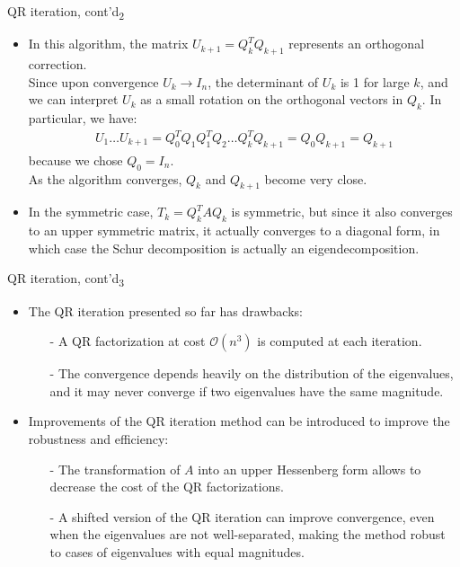 \documentclass[t,usepdftitle=false]{beamer}
\begin{document}
\begin{frame}{QR iteration, cont'd\textsubscript{2}}
\begin{itemize}
\item In this algorithm, the matrix $U_{k+1}=Q_k^TQ_{k+1}$ represents an orthogonal correction.\vspace{.1cm}\\
Since upon convergence $U_{k}\rightarrow I_n$, the determinant of $U_k$ is 1 for large $k$, and we can interpret $U_k$ as a small rotation on the orthogonal vectors in $Q_k$.
In particular, we have:
\begin{align*}
U_1\dots U_{k+1}=Q_0^TQ_1Q_1^TQ_2\dots Q_k^TQ_{k+1}=Q_0Q_{k+1}=Q_{k+1}
\end{align*}
because we chose $Q_0=I_n$.\vspace{.1cm}\\
As the algorithm converges, $Q_k$ and $Q_{k+1}$ become very close.
\item In the symmetric case, $T_k=Q_k^TAQ_k$ is symmetric, but since it also converges to an upper symmetric matrix, it actually converges to a diagonal form, in which case the Schur decomposition is actually an eigendecomposition.
\end{itemize}
\end{frame}

\begin{frame}{QR iteration, cont'd\textsubscript{3}}
\begin{itemize}
\item The QR iteration presented so far has drawbacks:
\begin{itemize}\normalsize
\item[-] A QR factorization at cost $\mathcal{O}(n^3)$ is computed at each iteration.\vspace{.1cm}
\item[-] The convergence depends heavily on the distribution of the eigenvalues, and it may never converge if two eigenvalues have the same magnitude.
\end{itemize}
\item Improvements of the QR iteration method can be introduced to improve the robustness and efficiency:
\begin{itemize}\normalsize
\item[-] The transformation of $A$ into an upper Hessenberg form allows to decrease the cost of the QR factorizations.\vspace{.1cm}
\item[-] A shifted version of the QR iteration can improve convergence, even when the eigenvalues are not well-separated, making the method robust to cases of eigenvalues with equal magnitudes.
\end{itemize}
\end{itemize}
\end{frame}
\end{document}
